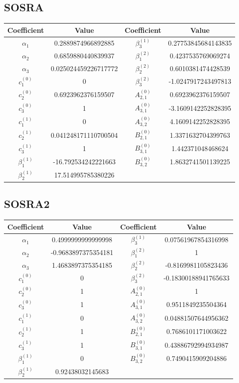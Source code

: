 \documentclass{article}
\begin{document}
\subsection{SOSRA \label{subsec:SOSRA}}
\begin{center}
	\begin{tabular}{|c|c||c|c|}
		\hline
		Coefficient & Value & Coefficient & Value\tabularnewline
		\hline
		\hline
		$\alpha_{1}$ & 0.2889874966892885 & $\beta_{3}^{(1)}$ & 0.27753845684143835\tabularnewline
		\hline
		$\alpha_{2}$ & 0.6859880440839937 & $\beta_{1}^{(2)}$ & 0.4237535769069274\tabularnewline
		\hline
		$\alpha_{3}$ & 0.025024459226717772 & $\beta_{2}^{(2)}$ & 0.6010381474428539\tabularnewline
		\hline
		$c_{1}^{(0)}$ & 0 & $\beta_{3}^{(2)}$ & -1.0247917243497813\tabularnewline
		\hline
		$c_{2}^{(0)}$ & 0.6923962376159507 & $A_{2,1}^{(0)}$ & 0.6923962376159507\tabularnewline
		\hline
		$c_{3}^{(0)}$ & 1 & $A_{3,1}^{(0)}$ & -3.1609142252828395\tabularnewline
		\hline
		$c_{1}^{(1)}$ & 0 & $A_{3,2}^{(0)}$ & 4.1609142252828395\tabularnewline
		\hline
		$c_{2}^{(1)}$ & 0.041248171110700504 & $B_{2,1}^{(0)}$ & 1.3371632704399763\tabularnewline
		\hline
		$c_{3}^{(1)}$ & 1 & $B_{3,1}^{(0)}$ & 1.442371048468624\tabularnewline
		\hline
		$\beta_{1}^{(1)}$ & -16.792534242221663 & $B_{3,2}^{(0)}$ & 1.8632741501139225\tabularnewline
		\hline
		$\beta_{2}^{(1)}$ & 17.514995785380226 &  & \tabularnewline
		\hline
	\end{tabular}
	\par\end{center}

\subsection{SOSRA2 \label{subsec:SOSRA2}}
\begin{center}
	\begin{tabular}{|c|c||c|c|}
		\hline
		Coefficient & Value & Coefficient & Value\tabularnewline
		\hline
		\hline
		$\alpha_{1}$ & 0.4999999999999998 & $\beta_{3}^{(1)}$ & 0.07561967854316998\tabularnewline
		\hline
		$\alpha_{2}$ & -0.9683897375354181 & $\beta_{1}^{(2)}$ & 1\tabularnewline
		\hline
		$\alpha_{3}$ & 1.4683897375354185 & $\beta_{2}^{(2)}$ & -0.8169981105823436\tabularnewline
		\hline
		$c_{1}^{(0)}$ & 0 & $\beta_{3}^{(2)}$ & -0.18300188941765633\tabularnewline
		\hline
		$c_{2}^{(0)}$ & 1 & $A_{2,1}^{(0)}$ & 1\tabularnewline
		\hline
		$c_{3}^{(0)}$ & 1 & $A_{3,1}^{(0)}$ & 0.9511849235504364\tabularnewline
		\hline
		$c_{1}^{(1)}$ & 0 & $A_{3,2}^{(0)}$ & 0.04881507644956362\tabularnewline
		\hline
		$c_{2}^{(1)}$ & 1 & $B_{2,1}^{(0)}$ & 0.7686101171003622\tabularnewline
		\hline
		$c_{3}^{(1)}$ & 1 & $B_{3,1}^{(0)}$ & 0.43886792994934987\tabularnewline
		\hline
		$\beta_{1}^{(1)}$ & 0 & $B_{3,2}^{(0)}$ & 0.7490415909204886\tabularnewline
		\hline
		$\beta_{2}^{(1)}$ & 0.92438032145683 &  & \tabularnewline
		\hline
	\end{tabular}
	\par\end{center}
\end{document}
